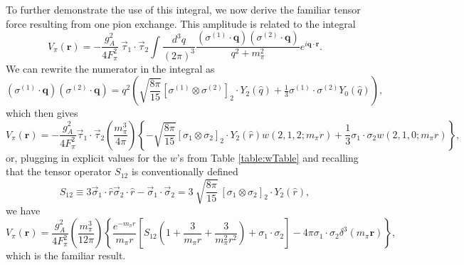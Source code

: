 \documentclass[%
 preprint,
 amsmath,amssymb,
 aps,
]{revtex4-1}
\newcommand{\taudot}{\vec{\tau}_1\cdot\vec{\tau}_2}
\newcommand{\sigmadot}{\vec{\sigma}_1\cdot\vec{\sigma}_2}
\begin{document}
To further demonstrate the use of this integral, we now derive the familiar tensor force resulting from one pion exchange. This amplitude is related to the integral
\begin{equation} 
V_\pi( \mathbf{r}) =  -\frac{g_A^2 }{4 F_\pi^2} \:\taudot \int \frac{d^3 q } {(2 \pi)^3 } \frac{(\sigma^{(1)} \cdot \mathbf{q} ) (\sigma^{(2)} \cdot \mathbf{q} ) } {q^2+m_\pi^2} e^{i \mathbf{q} \cdot \mathbf{r} }. 
\end{equation}
We can rewrite the numerator in the integral as
\begin{equation} (\sigma^{(1)} \cdot \mathbf{q}) ( \sigma^{(2)} \cdot \mathbf{q} )= q^2 \left(\sqrt{\frac{8\pi}{15}} [\sigma^{(1)} \otimes \sigma^{(2)}]_2 \cdot Y_2(\hat{q}) + \tfrac{1}{3} \sigma^{(1)} \cdot \sigma^{(2)}  Y_0(\hat{q}) \right),\end{equation}
which then gives
\begin{equation} 
V_\pi( \mathbf{r}) = - \frac{g_A^2 }{4 F_\pi^2} \taudot \left(\frac{m_\pi^3}{4 \pi}\right) \left\{ - \sqrt{\frac{8\pi}{15}} [\sigma_1 \otimes \sigma_2]_2 \cdot Y_2(\hat{r}) w(2,1,2; m_\pi r) + \frac{1}{3} \sigma_1 \cdot \sigma_2 w(2,1,0; m_\pi r ) \right\},  \end{equation}
or, plugging in explicit values for the $w$'s from Table \ref{table:wTable} and recalling that the tensor operator $S_{12}$ is conventionally defined
\begin{equation}
S_{12} \equiv   3\vec{\sigma}_1\cdot \hat{r}\vec{\sigma}_2\cdot \hat{r} -\sigmadot = 3\:\sqrt{\frac{8\pi}{15}} \:[\sigma_1 \otimes \sigma_2]_2 \cdot Y_2(\hat{r}) , 
\end{equation}
we have
\begin{equation} V_\pi( \mathbf{r})= \frac{g_A^2 }{4 F_\pi^2}  \left(\frac{m_\pi^3}{12 \pi}\right) \left\{ \frac{e^{-m_\pi r}}{m_\pi r} \left[ S_{12}\left(1+\frac{3}{m_\pi r}+ \frac{3}{m_\pi^2 r^2} \right) +  \sigma_1 \cdot \sigma_2 \right] - 4\pi  \sigma_1 \cdot \sigma_2 \delta^3(m_\pi \mathbf{r}) \right\}, 
\end{equation}
which is the familiar result.
\end{document}
